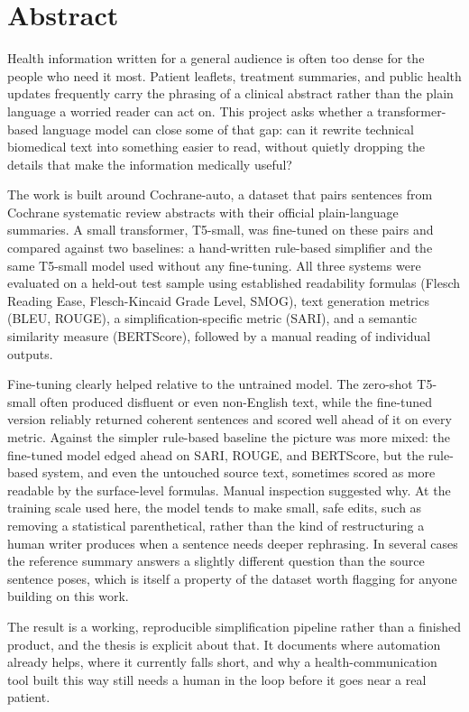 \chapter*{Abstract}

Health information written for a general audience is often too dense for the people who need it most. Patient leaflets, treatment summaries, and public health updates frequently carry the phrasing of a clinical abstract rather than the plain language a worried reader can act on. This project asks whether a transformer-based language model can close some of that gap: can it rewrite technical biomedical text into something easier to read, without quietly dropping the details that make the information medically useful?

The work is built around Cochrane-auto, a dataset that pairs sentences from Cochrane systematic review abstracts with their official plain-language summaries. A small transformer, T5-small, was fine-tuned on these pairs and compared against two baselines: a hand-written rule-based simplifier and the same T5-small model used without any fine-tuning. All three systems were evaluated on a held-out test sample using established readability formulas (Flesch Reading Ease, Flesch-Kincaid Grade Level, SMOG), text generation metrics (BLEU, ROUGE), a simplification-specific metric (SARI), and a semantic similarity measure (BERTScore), followed by a manual reading of individual outputs.

Fine-tuning clearly helped relative to the untrained model. The zero-shot T5-small often produced disfluent or even non-English text, while the fine-tuned version reliably returned coherent sentences and scored well ahead of it on every metric. Against the simpler rule-based baseline the picture was more mixed: the fine-tuned model edged ahead on SARI, ROUGE, and BERTScore, but the rule-based system, and even the untouched source text, sometimes scored as more readable by the surface-level formulas. Manual inspection suggested why. At the training scale used here, the model tends to make small, safe edits, such as removing a statistical parenthetical, rather than the kind of restructuring a human writer produces when a sentence needs deeper rephrasing. In several cases the reference summary answers a slightly different question than the source sentence poses, which is itself a property of the dataset worth flagging for anyone building on this work.

The result is a working, reproducible simplification pipeline rather than a finished product, and the thesis is explicit about that. It documents where automation already helps, where it currently falls short, and why a health-communication tool built this way still needs a human in the loop before it goes near a real patient.
